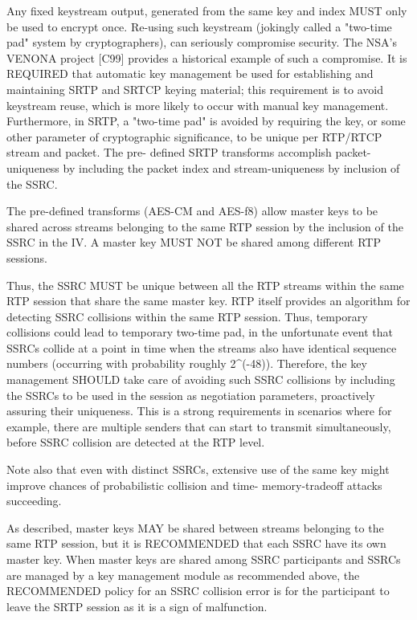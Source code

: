 \documentclass{article}
\begin{document}
Any fixed keystream output, generated from the same key and index MUST only be used to encrypt once.  Re-using such keystream (jokingly called a "two-time pad" system by cryptographers), can seriously compromise security.  The NSA's VENONA project [C99] provides a historical example of such a compromise.  It is REQUIRED that automatic key management be used for establishing and maintaining SRTP and SRTCP keying material; this requirement is to avoid keystream reuse, which is more likely to occur with manual key management.  Furthermore, in SRTP, a "two-time pad" is avoided by requiring the key, or some other parameter of cryptographic significance, to be unique per RTP/RTCP stream and packet.  The pre- defined SRTP transforms accomplish packet-uniqueness by including the packet index and stream-uniqueness by inclusion of the SSRC.

The pre-defined transforms (AES-CM and AES-f8) allow master keys to be shared across streams belonging to the same RTP session by the inclusion of the SSRC in the IV.  A master key MUST NOT be shared among different RTP sessions.

Thus, the SSRC MUST be unique between all the RTP streams within the same RTP session that share the same master key.  RTP itself provides an algorithm for detecting SSRC collisions within the same RTP session.  Thus, temporary collisions could lead to temporary two-time pad, in the unfortunate event that SSRCs collide at a point in time when the streams also have identical sequence numbers (occurring with probability roughly 2\textasciicircum{}(-48)).  Therefore, the key management SHOULD take care of avoiding such SSRC collisions by including the SSRCs to be used in the session as negotiation parameters, proactively assuring their uniqueness.  This is a strong requirements in scenarios where for example, there are multiple senders that can start to transmit simultaneously, before SSRC collision are detected at the RTP level.

Note also that even with distinct SSRCs, extensive use of the same key might improve chances of probabilistic collision and time- memory-tradeoff attacks succeeding.

As described, master keys MAY be shared between streams belonging to the same RTP session, but it is RECOMMENDED that each SSRC have its own master key.  When master keys are shared among SSRC participants and SSRCs are managed by a key management module as recommended above, the RECOMMENDED policy for an SSRC collision error is for the participant to leave the SRTP session as it is a sign of malfunction.
\end{document}
